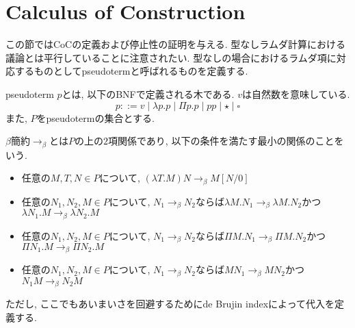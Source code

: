 \documentclass[12pt, titlepage]{ltjsarticle}
\begin{document}
\section{Calculus of Construction}
この節ではCoCの定義および停止性の証明を与える. 型なしラムダ計算における議論とは平行していることに注意されたい.
型なしの場合におけるラムダ項に対応するものとしてpseudotermと呼ばれるものを定義する.

\begin{defn}
 pseudoterm $p$とは, 以下のBNFで定義される木である. $v$は自然数を意味している.
 \[
 p ::= v \mid \lambda p. p \mid \Pi p. p \mid p p \mid \star \mid \square
 \]
 また, $P$をpseudotermの集合とする.
\end{defn}

\begin{defn}
 $\beta$簡約$\rightarrow_{\beta}$とは$P$の上の$2$項関係であり, 以下の条件を満たす最小の関係のことをいう.
 \begin{itemize}
  \item 任意の$M, T, N \in P$について, $(\lambda T. M) N \rightarrow_\beta M[N/0]$
  \item 任意の$N_1, N_2, M \in P$について, $N_1 \rightarrow_\beta N_2$ならば$\lambda M. N_1 \rightarrow_\beta \lambda M. N_2$かつ$\lambda N_1. M \rightarrow_\beta \lambda N_2. M$
  \item 任意の$N_1, N_2, M \in P$について, $N_1 \rightarrow_\beta N_2$ならば$\Pi M. N_1 \rightarrow_\beta \Pi M. N_2$かつ$\Pi N_1. M \rightarrow_\beta \Pi N_2. M$
  \item 任意の$N_1, N_2, M \in P$について, $N_1 \rightarrow_\beta N_2$ならば$M N_1 \rightarrow_\beta M N_2$かつ$N_1 M \rightarrow_\beta N_2 M$
 \end{itemize}
\end{defn}

 ただし, ここでもあいまいさを回避するためにde Brujin indexによって代入を定義する.
\end{document}
